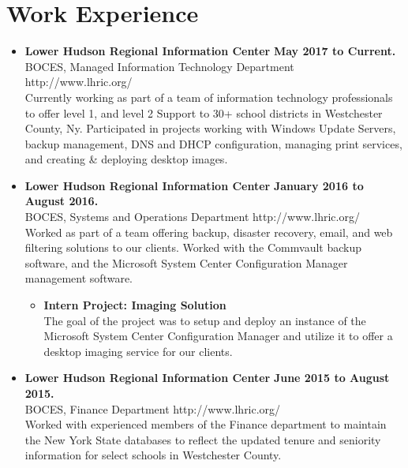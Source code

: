 \documentclass[10pt]{Article}
\begin{document}
\section*{Work Experience}
\begin{itemize}[topsep=1ex, itemsep=.5ex, parsep=0ex, partopsep=.7ex]
	\item[]{{\bf Lower Hudson Regional Information Center} \hfill {\bf May 2017 to Current.}}\\
	BOCES, Managed Information Technology Department \hfill http://www.lhric.org/\\
	Currently working as part of a team of information technology professionals to offer level 1, and level 2 Support to 30+ school districts in Westchester County, Ny.
	Participated in projects working with Windows Update Servers, backup management, DNS and DHCP configuration, managing print services, and creating \& deploying desktop images.
	\item[]{{\bf Lower Hudson Regional Information Center} \hfill {\bf January 2016 to August 2016.}}\\
	BOCES, Systems and Operations Department \hfill http://www.lhric.org/\\
	Worked as part of a team offering backup, disaster recovery, email, and web filtering solutions to our clients. Worked with the Commvault backup software, and the Microsoft System Center Configuration Manager management software.
	\begin{itemize}[topsep=1ex, itemsep=.5ex, parsep=0ex, partopsep=.7ex]
		\item[]{\bf Intern Project: Imaging Solution}\\
		The goal of the project was to setup and deploy an instance of the Microsoft System Center Configuration Manager and utilize it to offer a desktop imaging service for our clients.
	\end{itemize}
	\item[]{{\bf Lower Hudson Regional Information Center} \hfill {\bf June 2015 to August 2015.}}\\
	BOCES, Finance Department \hfill http://www.lhric.org/\\
	Worked with experienced members of the Finance department to maintain the New York
	State databases to reflect the updated tenure and seniority information for select schools in Westchester County.
\end{itemize}
\end{document}
